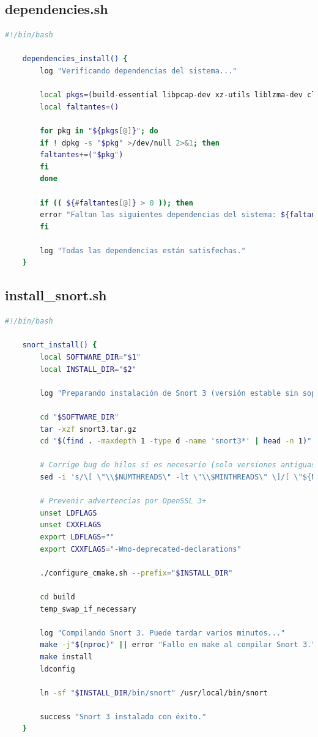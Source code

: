 \documentclass[11pt,a4paper,twoside]{report}
\begin{document}
\subsection*{dependencies.sh}
\begin{lstlisting}[language=bash, caption={\texttt{dependencies.sh}}, label={lst:dependencies-sh}]
	#!/bin/bash
	
	dependencies_install() {
		log "Verificando dependencias del sistema..."
		
		local pkgs=(build-essential libpcap-dev xz-utils liblzma-dev clamav clamav-daemon)
		local faltantes=()
		
		for pkg in "${pkgs[@]}"; do
		if ! dpkg -s "$pkg" >/dev/null 2>&1; then
		faltantes+=("$pkg")
		fi
		done
		
		if (( ${#faltantes[@]} > 0 )); then
		error "Faltan las siguientes dependencias del sistema: ${faltantes[*]}. Instálalas manualmente con: sudo apt install ${faltantes[*]}"
		fi
		
		log "Todas las dependencias están satisfechas."
	}
\end{lstlisting}

\subsection*{install\_snort.sh}
\begin{lstlisting}[language=bash, caption={\texttt{install\_snort.sh}}, label={lst:install-snort}]
	#!/bin/bash
	
	snort_install() {
		local SOFTWARE_DIR="$1"
		local INSTALL_DIR="$2"
		
		log "Preparando instalación de Snort 3 (versión estable sin soporte NUMA)..."
		
		cd "$SOFTWARE_DIR"
		tar -xzf snort3.tar.gz
		cd "$(find . -maxdepth 1 -type d -name 'snort3*' | head -n 1)"
		
		# Corrige bug de hilos si es necesario (solo versiones antiguas)
		sed -i 's/\[ \"\\$NUMTHREADS\" -lt \"\\$MINTHREADS\" \]/[ \"${NUMTHREADS:-0}\" -lt \"${MINTHREADS:-1}\" ]/' configure_cmake.sh
		
		# Prevenir advertencias por OpenSSL 3+
		unset LDFLAGS
		unset CXXFLAGS
		export LDFLAGS=""
		export CXXFLAGS="-Wno-deprecated-declarations"
		
		./configure_cmake.sh --prefix="$INSTALL_DIR"
		
		cd build
		temp_swap_if_necessary
		
		log "Compilando Snort 3. Puede tardar varios minutos..."
		make -j"$(nproc)" || error "Fallo en make al compilar Snort 3."
		make install
		ldconfig
		
		ln -sf "$INSTALL_DIR/bin/snort" /usr/local/bin/snort
		
		success "Snort 3 instalado con éxito."
	}
\end{lstlisting}
\end{document}
